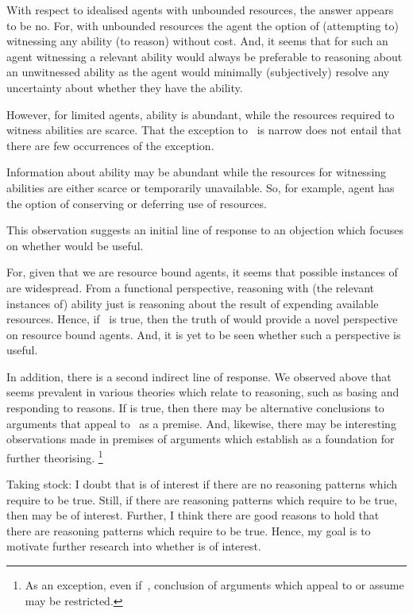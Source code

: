 \begin{note}
  With respect to idealised agents with unbounded resources, the answer appears to be no.
  For, with unbounded resources the agent the option of (attempting to) witnessing any ability (to reason) without cost.
  And, it seems that for such an agent witnessing a relevant ability would always be preferable to reasoning about an unwitnessed ability as the agent would minimally (subjectively) resolve any uncertainty about whether they have the ability.

  However, for limited agents, ability is abundant, while the resources required to witness abilities are scarce.
  That the exception to~\ESU{} is narrow does not entail that there are few occurrences of the exception.

  Information about ability may be abundant while the resources for witnessing abilities are either scarce or temporarily unavailable.
  So, for example, agent has the option of conserving or deferring use of resources.

  This observation suggests an initial line of response to an objection which focuses on whether \EAS{} would be useful.

  For, given that we are resource bound agents, it seems that possible instances of \EAS{} are widespread.
  From a functional perspective, reasoning with (the relevant instances of) ability just is reasoning about the result of expending available resources.
  Hence, if~\EAS{} is true, then the truth of \EAS{} would provide a novel perspective on resource bound agents.
  And, it is yet to be seen whether such a perspective is useful.

  In addition, there is a second indirect line of response.
  We observed above that \ESU{} seems prevalent in various theories which relate to reasoning, such as basing and responding to reasons.
  If \EAS{} is true, then there may be alternative conclusions to arguments that appeal to~\ESU{} as a premise.
  And, likewise, there may be interesting observations made in premises of arguments which establish \ESU{} as a foundation for further theorising.\nolinebreak
  \footnote{
    As an exception, even if~\EAS{}, conclusion of arguments which appeal to or assume \ESU{} may be restricted.
  }
\end{note}

\begin{note}
  Taking stock:
  I doubt that \EAS{} is of interest if there are no reasoning patterns which require \EAS{} to be true.
  Still, if there are reasoning patterns which require \EAS{} to be true, then \EAS{} may be of interest.
  Further, I think there are good reasons to hold that there are reasoning patterns which require \EAS{} to be true.
  Hence, my goal is to motivate further research into whether \EAS{} is of interest.
\end{note}

